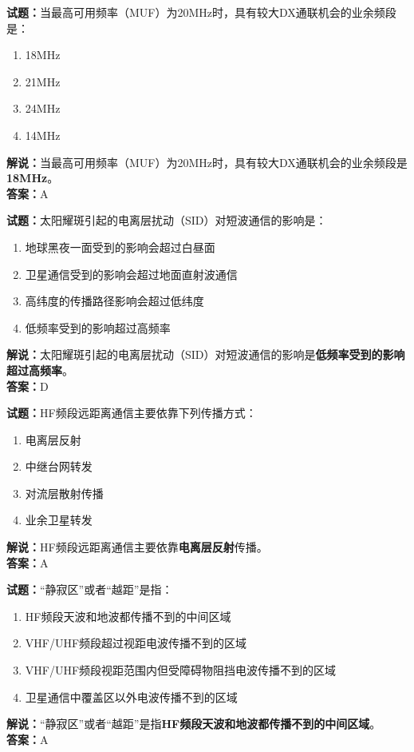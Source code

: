 \documentclass{ctexbook}
\begin{document}
\bigskip


\noindent\textbf{试题：}当最高可用频率（MUF）为20\unit{\MHz}时，具有较大DX通联机会的业余频段是：
\begin{enumerate}[leftmargin=3em]
\item 18\unit{\MHz}
\item 21\unit{\MHz}
\item 24\unit{\MHz}
\item 14\unit{\MHz}
\end{enumerate}
\noindent\textbf{解说：}当最高可用频率（MUF）为20\unit{\MHz}时，具有较大DX通联机会的业余频段是\textbf{18\unit{\MHz}}。\\\noindent\textbf{答案：}A



\bigskip


\noindent\textbf{试题：}太阳耀斑引起的电离层扰动（SID）对短波通信的影响是：
\begin{enumerate}[leftmargin=3em]
\item 地球黑夜一面受到的影响会超过白昼面
\item 卫星通信受到的影响会超过地面直射波通信
\item 高纬度的传播路径影响会超过低纬度
\item 低频率受到的影响超过高频率
\end{enumerate}
\noindent\textbf{解说：}太阳耀斑引起的电离层扰动（SID）对短波通信的影响是\textbf{低频率受到的影响超过高频率}。\\\noindent\textbf{答案：}D



\bigskip


\noindent\textbf{试题：}HF频段远距离通信主要依靠下列传播方式：
\begin{enumerate}[leftmargin=3em]
\item 电离层反射
\item 中继台网转发
\item 对流层散射传播
\item 业余卫星转发
\end{enumerate}
\noindent\textbf{解说：}HF频段远距离通信主要依靠\textbf{电离层反射}传播。\\\noindent\textbf{答案：}A


\bigskip


\noindent\textbf{试题：}“静寂区”或者“越距”是指：
\begin{enumerate}[leftmargin=3em]
\item HF频段天波和地波都传播不到的中间区域
\item VHF/UHF频段超过视距电波传播不到的区域
\item VHF/UHF频段视距范围内但受障碍物阻挡电波传播不到的区域
\item 卫星通信中覆盖区以外电波传播不到的区域
\end{enumerate}
\noindent\textbf{解说：}“静寂区”或者“越距”是指\textbf{HF频段天波和地波都传播不到的中间区域}。\\\noindent\textbf{答案：}A
\end{document}
